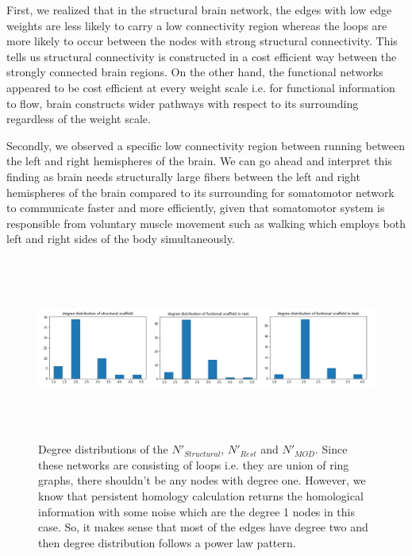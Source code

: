 \documentclass[9pt,twocolumn,twoside,lineno]{pnas-new}
\begin{document}
First, we realized that in the structural brain network, the edges with low edge weights are less likely to carry a low connectivity region whereas the loops are more likely to occur between the nodes with strong structural connectivity. This tells us structural connectivity is constructed in a cost efficient way between the strongly connected brain regions. On the other hand, the functional networks appeared to be cost efficient at every weight scale i.e. for functional information to flow, brain constructs wider pathways with respect to its surrounding regardless of the weight scale.

Secondly, we observed a specific low connectivity region between running between the left and right hemispheres of the brain. We can go ahead and interpret this finding as brain needs structurally large fibers between the left and right hemispheres of the brain compared to its surrounding for somatomotor network to communicate faster and more efficiently, given that somatomotor system is responsible from voluntary muscle movement such as walking which employs both left and right sides of the body simultaneously.


\begin{figure}%
\centering
\includegraphics[width=16cm,height=6cm]{degreedists.png}
\caption{Degree distributions of the $N'_{Structural}$, $N'_{Rest}$ and $N'_{MOD}$. Since these networks are consisting of loops i.e. they are union of ring graphs, there shouldn't be any nodes with degree one. However, we know that persistent homology calculation returns the homological information with some noise which are the degree 1 nodes in this case. So, it makes sense that most of the edges have degree two and then degree distribution follows a power law pattern.}
\end{figure}
\end{document}
